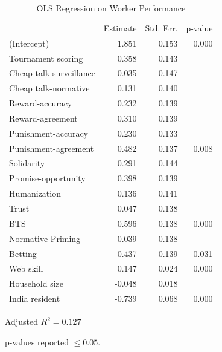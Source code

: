 \documentclass{chi2009}
\begin{document}
\begin{table}[ht]					%
\begin{center}						%
\caption{OLS Regression on Worker Performance} %
\vspace{8pt}
\begin{threeparttable}
\begin{tabular}{@{}l r  r r@{}}
\toprule
 & Estimate & Std. Err. & p-value\tnote{\dag}\\
\cmidrule(l){2-4}
(Intercept) & 1.851 & 0.153 & 0.000\\
Tournament scoring & 0.358 & 0.143 &\\
Cheap talk-surveillance & 0.035 & 0.147 &\\
Cheap talk-normative & 0.131 & 0.140 &\\
Reward-accuracy & 0.232 & 0.139 &\\
Reward-agreement & 0.310 & 0.139 &\\
Punishment-accuracy & 0.230 & 0.133 &\\
Punishment-agreement & 0.482 & 0.137 & 0.008\\
Solidarity & 0.291 & 0.144 &\\
Promise-opportunity & 0.398 & 0.139 &\\
Humanization & 0.136 & 0.141 &\\
Trust & 0.047 & 0.138 &\\
BTS & 0.596 & 0.138 & 0.000\\
Normative Priming & 0.039 & 0.138 &\\
Betting & 0.437 & 0.139 & 0.031\\
Web skill & 0.147 & 0.024 & 0.000\\
Household size  & -0.048 & 0.018 &\\
India resident & -0.739 & 0.068 & 0.000\\
\bottomrule
\end{tabular}
  \begin{tablenotes}[para]
	\item Adjusted $R^{2} = 0.127$\\
	\item[\dag]p-values reported $\leq 0.05$.\\
  \end{tablenotes}
\end{threeparttable}
\label{table:demog_control_model}
\end{center}
\end{table}
\end{document}
